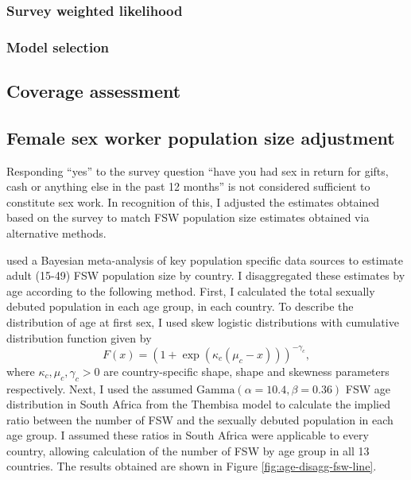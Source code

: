 \documentclass[a4paper, nobind]{templates/ociamthesis}
\begin{document}
\hypertarget{survey-weighted-likelihood-1}{%
\subsubsection{Survey weighted likelihood}\label{survey-weighted-likelihood-1}}

\hypertarget{model-selection-1}{%
\subsubsection{Model selection}\label{model-selection-1}}

\hypertarget{coverage-assessment}{%
\subsection{Coverage assessment}\label{coverage-assessment}}

\hypertarget{female-sex-worker-population-size-adjustment}{%
\subsection{Female sex worker population size adjustment}\label{female-sex-worker-population-size-adjustment}}

Responding ``yes'' to the survey question ``have you had sex in return for gifts, cash or anything else in the past 12 months'' is not considered sufficient to constitute sex work.
In recognition of this, I adjusted the estimates obtained based on the survey to match FSW population size estimates obtained via alternative methods.

\textcite{stevens2022estimating} used a Bayesian meta-analysis of key population specific data sources to estimate adult (15-49) FSW population size by country.
I disaggregated these estimates by age according to the following method.
First, I calculated the total sexually debuted population in each age group, in each country.
To describe the distribution of age at first sex, I used skew logistic distributions \autocite{nguyen2022trends} with cumulative distribution function given by
\begin{equation}
F(x) = \left(1 + \exp(\kappa_c (\mu_c - x)) \right)^{- \gamma_c},
\end{equation}
where \(\kappa_c, \mu_c, \gamma_c > 0\) are country-specific shape, shape and skewness parameters respectively.
Next, I used the assumed \(\text{Gamma}(\alpha = 10.4, \beta = 0.36)\) FSW age distribution in South Africa from the Thembisa model \autocite{johnson2020thembisa} to calculate the implied ratio between the number of FSW and the sexually debuted population in each age group.
I assumed these ratios in South Africa were applicable to every country, allowing calculation of the number of FSW by age group in all 13 countries.
The results obtained are shown in Figure \ref{fig:age-disagg-fsw-line}.
\end{document}
